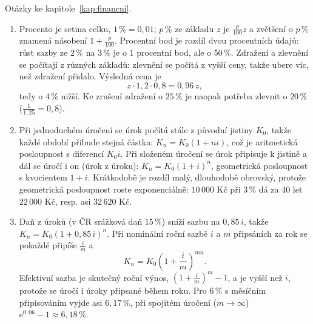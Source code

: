 Otázky ke kapitole~\ref{kap:financni}.

\begin{enumerate}[label=\textbf{\arabic*.}, leftmargin=*, itemsep=0.8em]
  \item {}
  Procento je setina celku, $1\,\% = 0{,}01$; $p\,\%$ ze základu $z$ je $\frac{p}{100}z$ a zvětšení o $p\,\%$ znamená násobení $1 + \frac{p}{100}$. Procentní bod je rozdíl dvou procentních údajů: růst sazby ze $2\,\%$ na $3\,\%$ je o $1$ procentní bod, ale o $50\,\%$. Zdražení a zlevnění se počítají z různých základů: zlevnění se počítá z vyšší ceny, takže ubere víc, než zdražení přidalo. Výsledná cena je
  \begin{equation*}
    z\cdot 1{,}2\cdot 0{,}8 = 0{,}96\,z,
  \end{equation*}
  tedy o $4\,\%$ nižší. Ke zrušení zdražení o $25\,\%$ je naopak potřeba zlevnit o $20\,\%$ ($\frac{1}{1{,}25} = 0{,}8$). 

  \item {}
  Při jednoduchém úročení se úrok počítá stále z původní jistiny $K_0$, takže každé období přibude stejná částka: $K_n = K_0(1 + ni)$, což je aritmetická posloupnost s diferencí $K_0i$. Při složeném úročení se úrok připisuje k jistině a dál se úročí i on (úrok z úroku): $K_n = K_0{(1 + i)}^n$, geometrická posloupnost s kvocientem $1 + i$. Krátkodobě je rozdíl malý, dlouhodobě obrovský, protože geometrická posloupnost roste exponenciálně: $10\,000$ Kč při $3\,\%$ dá za $40$ let $22\,000$ Kč, resp. asi $32\,620$ Kč. 

  \item {}
  Daň z úroků (v ČR srážková daň $15\,\%$) sníží sazbu na $0{,}85\,i$, takže $K_n = K_0{(1 + 0{,}85\,i)}^n$. Při nominální roční sazbě $i$ a $m$ připsáních za rok se pokaždé připíše $\frac{i}{m}$ a
  \begin{equation*}
    K_n = K_0{\left(1 + \frac{i}{m}\right)}^{mn}.
  \end{equation*}
  Efektivní sazba je skutečný roční výnos, ${\left(1 + \frac{i}{m}\right)}^m - 1$, a je vyšší než $i$, protože se úročí i úroky připsané během roku. Pro $6\,\%$ s měsíčním připisováním vyjde asi $6{,}17\,\%$, při spojitém úročení ($m\to\infty$) $\mathrm{e}^{0{,}06} - 1\approx 6{,}18\,\%$. 


\end{enumerate}
